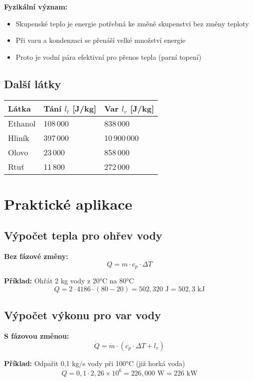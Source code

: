 \documentclass[11pt,a4paper]{article}
\begin{document}
\textbf{Fyzikální význam:}
\begin{itemize}
\item Skupenské teplo je energie potřebná ke změně skupenství bez změny teploty
\item Při varu a kondenzaci se přenáší velké množství energie
\item Proto je vodní pára efektivní pro přenos tepla (parní topení)
\end{itemize}

\subsection{Další látky}

\begin{longtable}{lll}
\toprule
Látka & Tání $l_t$ [J/kg] & Var $l_v$ [J/kg] \\
\midrule
Ethanol & 108\,000 & 838\,000 \\
Hliník & 397\,000 & 10\,900\,000 \\
Olovo & 23\,000 & 858\,000 \\
Rtuť & 11\,800 & 272\,000 \\
\bottomrule
\end{longtable}

\clearpage

\section{Praktické aplikace}

\subsection{Výpočet tepla pro ohřev vody}

\textbf{Bez fázové změny:}
\[Q = m \cdot c_p \cdot \Delta T\]

\textbf{Příklad:} Ohřát 2 kg vody z 20°C na 80°C
\[Q = 2 \cdot 4186 \cdot (80-20) = 502{,}320 \text{ J} = 502{,}3 \text{ kJ}\]

\subsection{Výpočet výkonu pro var vody}

\textbf{S fázovou změnou:}
\[\dot{Q} = \dot{m} \cdot (c_p \cdot \Delta T + l_v)\]

\textbf{Příklad:} Odpařit 0,1 kg/s vody při 100°C (již horká voda)
\[\dot{Q} = 0{,}1 \cdot 2{,}26 \times 10^6 = 226{,}000 \text{ W} = 226 \text{ kW}\]
\end{document}
